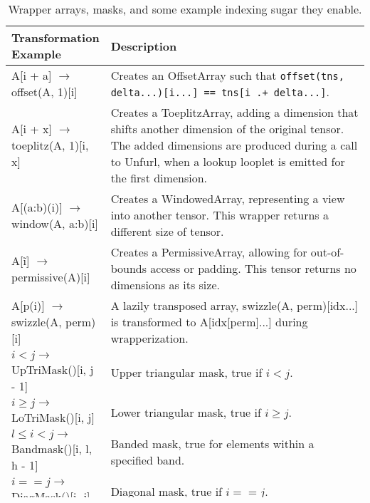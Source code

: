     \begin{table}[h]
        \scriptsize
        \centering
        \begin{tabular}{|>{\raggedright\arraybackslash}m{0.25\linewidth}|>{\raggedright\arraybackslash}m{0.75\linewidth}|}
        \hline
        \textbf{Transformation Example} & \textbf{Description} \\
        \hline
        A[i + a] $\rightarrow$ offset(A, 1)[i] & Creates an OffsetArray such that \texttt{offset(tns, delta...)[i...] == tns[i .+ delta...]}. \\
        \hline
        A[i + x] $\rightarrow$ toeplitz(A, 1)[i, x] & Creates a ToeplitzArray, adding a dimension that shifts another dimension of the original tensor. The added dimensions are produced during a call to Unfurl, when a lookup looplet is emitted for the first dimension. \\
        \hline
        A[(a:b)(i)] $\rightarrow$ window(A, a:b)[i] & Creates a WindowedArray, representing a view into another tensor. This wrapper returns a different size of tensor. \\
        \hline
        A[\~i] $\rightarrow$ permissive(A)[i] & Creates a PermissiveArray, allowing for out-of-bounds access or padding. This tensor returns no dimensions as its size. \\
        \hline
        A[p(i)] $\rightarrow$ swizzle(A, perm)[i] & A lazily transposed array, swizzle(A, perm)[idx...] is transformed to A[idx[perm]...] during wrapperization. \\
        \hline
        $i < j \rightarrow$ UpTriMask()[i, j - 1] & Upper triangular mask, true if $i < j$. \\
        \hline
        $i \geq j \rightarrow$ LoTriMask()[i, j] & Lower triangular mask, true if $i \geq j$. \\
        \hline
        $l \leq i < j \rightarrow$ Bandmask()[i, l, h - 1] & Banded mask, true for elements within a specified band. \\
        \hline
        $i == j \rightarrow$ DiagMask()[i, j] & Diagonal mask, true if $i == j$. \\
        \hline
        $i \neq j \rightarrow$ !(DiagMask()[i, j]) & Inverse diagonal mask, true if $i \neq j$. \\
        \hline
        chunkmask(b) & Chunk mask, for chunked tensor access. True if $b \times (j - 1) < i \leq b \times j$. \\
        \hline
        \end{tabular}
        \caption{Wrapper arrays, masks, and some example indexing sugar they enable.}
    \label{tab:wrappers}
    \end{table}

